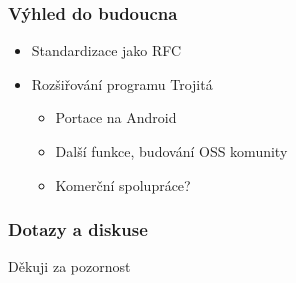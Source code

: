 \documentclass{beamer}
\begin{document}
\begin{frame}[fragile]
  \frametitle{Výhled do budoucna}
  \begin{itemize}
    \item Standardizace jako RFC
    \item Rozšiřování programu Trojitá
      \begin{itemize}
        \item Portace na Android
        \item Další funkce, budování OSS komunity
        \item Komerční spolupráce?
      \end{itemize}
  \end{itemize}
\end{frame}

\begin{frame}[fragile]
  \frametitle{Dotazy a diskuse}
  \begin{center}
    \Large{Děkuji za pozornost}
  \end{center}
\end{frame}
\end{document}

